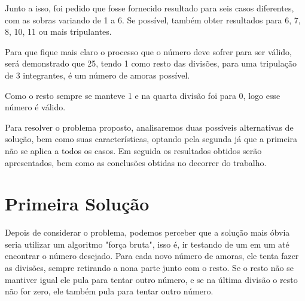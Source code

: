 \documentclass[12pt]{article}
\begin{document}
Junto a isso, foi pedido que fosse fornecido resultado para seis casos diferentes, com as sobras variando de 1 a 6. Se possível, também obter resultados para 6, 7, 8, 10, 11 ou mais tripulantes.

\vspace{0.5cm}

Para que fique mais claro o processo que o número deve sofrer para ser válido, será demonstrado que 25, tendo 1 como resto das divisões, para uma tripulação de 3 integrantes, é um número de amoras possível.

\vspace{0.5cm}

\hspace{3.0cm}\qquad{}\qquad{}

\vspace{0.5cm}

\hspace{3.0cm}\qquad{}\qquad{}

\vspace{0.5cm}

\hspace{3.0cm}\qquad{}\qquad{}

\vspace{0.5cm}

\hspace{5.3cm}

\vspace{0.5cm}

Como o resto sempre se manteve 1 e na quarta divisão foi para 0, logo esse número é válido.

\vspace{0.5cm}

Para resolver o problema proposto, analisaremos duas possíveis alternativas de solução, bem como suas características, optando pela segunda já que a primeira não se aplica a todos os casos. Em seguida os resultados obtidos serão apresentados, bem como as conclusões obtidas no decorrer do trabalho.

\section{Primeira Solução}

Depois de considerar o problema, podemos perceber que a solução mais óbvia seria utilizar um algoritmo "força bruta", isso é, ir testando de um em um até encontrar o número desejado. Para cada novo número de amoras, ele tenta fazer as divisões, sempre retirando a nona parte junto com o resto. Se o resto não se mantiver igual ele pula para tentar outro número, e se na última divisão o resto não for zero, ele também pula para tentar outro número.
\end{document}
